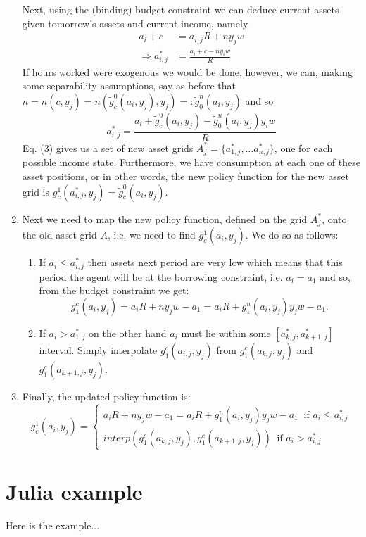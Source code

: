 \documentclass[11pt]{article}
\theoremstyle{definition}
\begin{document}
\begin{enumerate}
	Next, using the (binding) budget constraint we can deduce current assets given tomorrow's assets and current income, namely
	\begin{align*}
	a_{i} + c &= a_{i,j} R + ny_{j}w\\
	\Rightarrow a_{i,j}^{\ast}&=\frac{a_{i}+c-ny_{i}w}{R}
	\end{align*}
	If hours worked were exogenous we would be done, however, we can, making some separability assumptions, say as before that $n=n(c,y_{j})=n(\tilde{g}_{c}^{0}(a_{i},y_{j}),y_{j})=:\tilde{g}_{0}^{n}(a_{i},y_{j})$ and so
	\begin{equation}
	a_{i,j}^{\ast}=\frac{a_{i}+\tilde{g}_{c}^{0}(a_{i},y_{j})-\tilde{g}_{0}^{n}(a_{i},y_{j})y_{i}w}{R}
	\end{equation}
	Eq. (3) gives us a set of new asset grids $A^{\ast}_{j}=\{a_{1,j}^{\ast},\dots a_{n,j}^{\ast}\}$, one for each possible income state. Furthermore, we have consumption at each one of these asset positions, or in other words, the new policy function for the new asset grid is $g_{c}^{1}(a_{i,j}^{\ast},y_{j})=\tilde{g}_{c}^{0}(a_{i},y_{j})$.
	\item  Next we need to map the new policy function, defined on the grid $A_{j}^{\ast}$, onto the old asset grid $A$, i.e. we need to find $g_{c}^{1}(a_{i},y_{j})$. We do so as follows:
	\begin{enumerate}
		\item If $a_{i}\leq a_{i,j}^{\ast}$ then assets next period are very low which means that this period the agent will be at the borrowing constraint, i.e. $a_{i}=a_{1}$ and so, from the budget constraint we get:
		$$g_{1}^{c}(a_{i},y_{j})=a_{i}R+ny_{j}w-a_{1}=a_{i}R+g_{1}^{n}(a_{i},y_{j})y_{j}w-a_{1}.$$
		\item If $a_{i}>a_{1,j}^{\ast}$ on the other hand $a_{i}$ must lie within some $\left[a_{k,j}^{\ast},a_{k+1,j}^{\ast}\right]$ interval. Simply interpolate $g_{1}^{c}(a_{i,j},y_{j})$ from $g_{1}^{c}(a_{k,j},y_{j})$ and $g_{1}^{c}(a_{k+1,j},y_{j})$.
	\end{enumerate}
	\item Finally, the updated policy function is:
	\begin{equation}
	g_{c}^{1}(a_{i},y_{j})=\begin{cases}
	a_{i}R+ny_{j}w-a_{1}=a_{i}R+g_{1}^{n}(a_{i},y_{j})y_{j}w-a_{1} \;\; \text{if } a_{i}\leq a_{i,j}^{\ast}\\
	interp\left(g_{1}^{c}(a_{k,j},y_{j}),g_{1}^{c}(a_{k+1,j},y_{j})\right) \;\; \text{if } a_{i}> a_{i,j}^{\ast}
	\end{cases}
	\end{equation}
\end{enumerate}


\section{Julia example}
\begin{shaded}
Here is the example...
\end{shaded}
\end{document}
